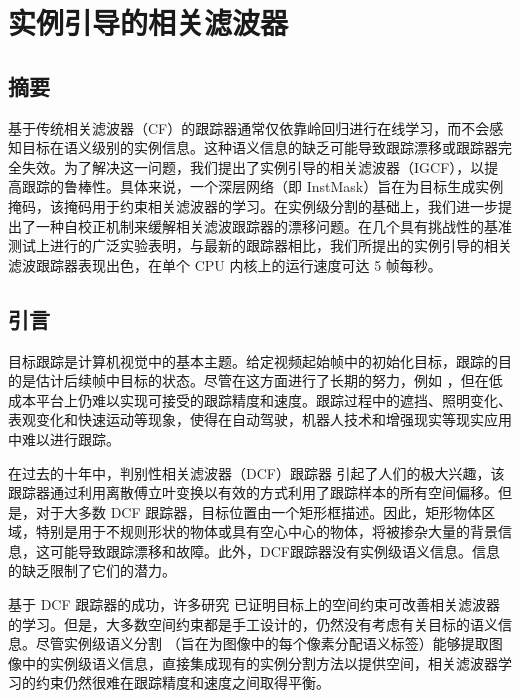 \chapter{实例引导的相关滤波器}\label{chap:IGCF}

\section{摘要}
基于传统相关滤波器（CF）的跟踪器通常仅依靠岭回归进行在线学习，而不会感知目标在语义级别的实例信息。这种语义信息的缺乏可能导致跟踪漂移或跟踪器完全失效。为了解决这一问题，我们提出了实例引导的相关滤波器（IGCF），以提高跟踪的鲁棒性。具体来说，一个深层网络（即 InstMask）旨在为目标生成实例掩码，该掩码用于约束相关滤波器的学习。在实例级分割的基础上，我们进一步提出了一种自校正机制来缓解相关滤波跟踪器的漂移问题。在几个具有挑战性的基准测试上进行的广泛实验表明，与最新的跟踪器相比，我们所提出的实例引导的相关滤波跟踪器表现出色，在单个 CPU 内核上的运行速度可达 5 帧每秒。

\section{引言}
目标跟踪是计算机视觉中的基本主题。给定视频起始帧中的初始化目标，跟踪的目的是估计后续帧中目标的状态。尽管在这方面进行了长期的努力，例如 \cite{Leang2018OnlineFO, Wang2019VisualOT, Zhang2018UsingFL}，但在低成本平台上仍难以实现可接受的跟踪精度和速度。跟踪过程中的遮挡、照明变化、表观变化和快速运动等现象，使得在自动驾驶，机器人技术和增强现实等现实应用中难以进行跟踪。

在过去的十年中，判别性相关滤波器（DCF）跟踪器 \cite{bolme2010visual, Zhang2018VisualTU} 引起了人们的极大兴趣，该跟踪器通过利用离散傅立叶变换以有效的方式利用了跟踪样本的所有空间偏移。但是，对于大多数 DCF 跟踪器，目标位置由一个矩形框描述。因此，矩形物体区域，特别是用于不规则形状的物体或具有空心中心的物体，将被掺杂大量的背景信息，这可能导致跟踪漂移和故障。此外，DCF跟踪器没有实例级语义信息。信息的缺乏限制了它们的潜力。

基于 DCF 跟踪器的成功，许多研究 \cite{Danelljan2015LearningSR, Lukezic2017DiscriminativeCF} 已证明目标上的空间约束可改善相关滤波器的学习。但是，大多数空间约束都是手工设计的，仍然没有考虑有关目标的语义信息。尽管实例级语义分割 \cite{Pinheiro2015LearningTS, Zhang2019ProgressivelyDN}（旨在为图像中的每个像素分配语义标签）能够提取图像中的实例级语义信息，直接集成现有的实例分割方法以提供空间，相关滤波器学习的约束仍然很难在跟踪精度和速度之间取得平衡。

